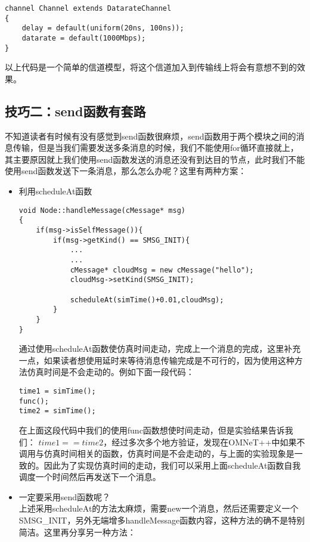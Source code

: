 \begin{lstlisting}
channel Channel extends DatarateChannel
{
	delay = default(uniform(20ns, 100ns));
	datarate = default(1000Mbps);
}
\end{lstlisting}

以上代码是一个简单的信道模型，将这个信道加入到传输线上将会有意想不到的效果。\\

\subsection{技巧二：send函数有套路}
不知道读者有时候有没有感觉到send函数很麻烦，send函数用于两个模块之间的消息传输，但是当我们需要发送多条消息的时候，我们不能使用for循环直接就上，其主要原因就上我们使用send函数发送的消息还没有到达目的节点，此时我们不能使用send函数发送下一条消息，那么怎么办呢？这里有两种方案：

\begin{itemize}
	\item 利用scheduleAt函数
	
\begin{lstlisting}
void Node::handleMessage(cMessage* msg)
{
	if(msg->isSelfMessage()){
		if(msg->getKind() == SMSG_INIT){
			...
			...
			cMessage* cloudMsg = new cMessage("hello");
			cloudMsg->setKind(SMSG_INIT);
			
			scheduleAt(simTime()+0.01,cloudMsg);
		}
	}
}
\end{lstlisting}
	
通过使用scheduleAt函数使仿真时间走动，完成上一个消息的完成，这里补充一点，如果读者想使用延时来等待消息传输完成是不可行的，因为使用这种方法仿真时间是不会走动的。例如下面一段代码：

\begin{lstlisting}
time1 = simTime();
func();
time2 = simTime();
\end{lstlisting}
在上面这段代码中我们的使用func函数想使时间走动，但是实验结果告诉我们：
$time1==time2$，经过多次多个地方验证，发现在OMNeT++中如果不调用与仿真时间相关的函数，仿真时间是不会走动的，与上面的实验现象是一致的。因此为了实现仿真时间的走动，我们可以采用上面scheduleAt函数自我调度一个时间然后再发送下一个消息。
	\item 一定要采用send函数呢？\\
上述采用scheduleAt的方法太麻烦，需要new一个消息，然后还需要定义一个SMSG\_INIT，另外无端增多handleMessage函数内容，这种方法的确不是特别简洁。这里再分享另一种方法：\\
\end{itemize}




